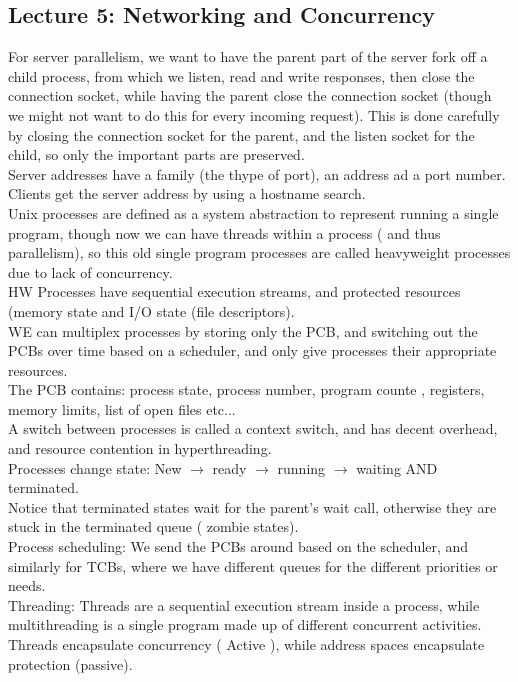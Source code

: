 \documentclass[paper=a4, fontsize=11pt]{scrartcl} %
\numberwithin{equation}{section} %
\numberwithin{figure}{section} %
\numberwithin{table}{section} %
\begin{document}
\subsection{Lecture 5: Networking and Concurrency}
For server parallelism, we want to have the parent part of the server fork off a child process, from which we listen, read and write responses, then close the connection socket, while having the parent close the connection socket (though we might not want to do this for every incoming request). This is done carefully by closing the connection socket for the parent, and the listen socket for the child, so only the important parts are preserved.\\
Server addresses have a family (the thype of port), an address ad a port number.\\
Clients get the server address by using a hostname search. \\
Unix processes are defined as a system abstraction to represent running a single program, though now we can have threads within a process ( and thus parallelism), so this old single program processes are called heavyweight processes due to lack of concurrency. \\
HW Processes have sequential execution streams, and protected resources (memory state and I/O state (file descriptors). \\
WE can multiplex processes by storing only the PCB, and switching out the PCBs over time based on a scheduler, and only give processes their appropriate resources.\\
The PCB contains: process state, process number, program counte , registers, memory limits, list of open files etc...\\
A switch between processes is called a context switch, and has decent overhead, and resource contention in hyperthreading. \\
Processes change state: New $\rightarrow$ ready $\rightarrow$ running $\rightarrow$ waiting AND terminated. \\
Notice that terminated states wait for the parent's wait call, otherwise they are stuck in the terminated queue ( zombie states). \\
Process scheduling: We send the PCBs around based on the scheduler, and similarly for TCBs, where we have different queues for the different priorities or needs.\\
Threading: Threads are a sequential execution stream inside a process, while multithreading is a single program made up of different concurrent activities. Threads encapsulate concurrency ( Active ), while address spaces encapsulate protection (passive).\\
\end{document}

